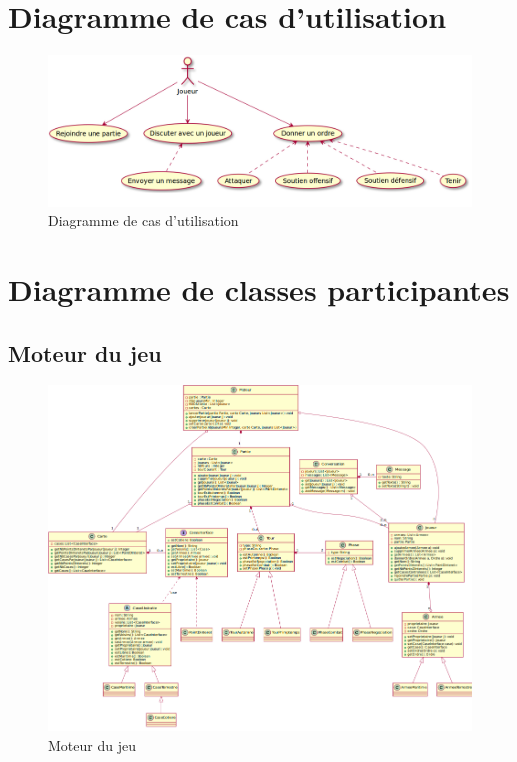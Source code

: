 \section{Diagramme de cas d'utilisation}
	\begin{figure}[!h]
		\centering
		\includegraphics[scale=0.4]{images/UseCase.png}
		\caption{Diagramme de cas d'utilisation}
	\end{figure}

\newpage

\section{Diagramme de classes participantes}
	\subsection{Moteur du jeu}
		\begin{figure}[!h]
			\centering
			\includegraphics[scale=0.6,angle=90]{images/DCP1.png}
			\caption{Moteur du jeu}
		\end{figure}
	\newpage
